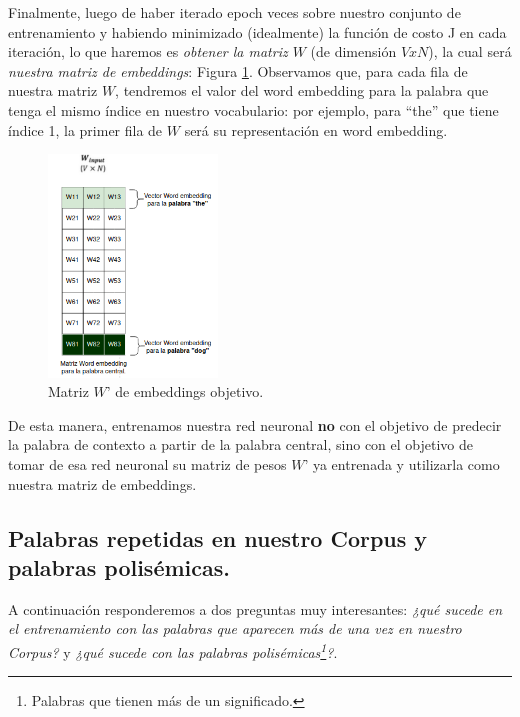 \documentclass[12pt,a4paper]{article}
\begin{document}
\begin{sloppypar}
\begin{enumerate}
\end{enumerate}
      
Finalmente, luego de haber iterado epoch veces sobre nuestro conjunto de entrenamiento y habiendo minimizado (idealmente) la función de costo J en cada iteración, lo que haremos es \textit{obtener la matriz $W$} (de dimensión $V x N$), la cual será \textit{nuestra matriz de embeddings}: Figura \ref{fig:9_EjSkip}. Observamos que, para cada fila de nuestra matriz $W$, tendremos el valor del word embedding para la palabra que tenga el mismo índice en nuestro vocabulario: por ejemplo, para “the” que tiene índice 1, la primer fila de $W$ será su representación en word embedding.

\begin{figure}[H]    %
\centering
\includegraphics[width=0.4\textwidth]{images/Ejemplo_Skipgram/9_EjSkip.png}
\caption{Matriz $W’$ de embeddings objetivo.} 
\label{fig:9_EjSkip}
\end{figure}

De esta manera, entrenamos nuestra red neuronal \textbf{no} con el objetivo de predecir la palabra de contexto a partir de la palabra central, sino con el objetivo de tomar de esa red neuronal su matriz de pesos $W’$ ya entrenada y utilizarla como nuestra matriz de embeddings. \\

\subsection{Palabras repetidas en nuestro Corpus y palabras polisémicas.}\label{anexo_polisem}

A continuación responderemos a dos preguntas muy interesantes: \textit{¿qué sucede en el entrenamiento con las palabras que aparecen más de una vez en nuestro Corpus?} y \textit{¿qué sucede con las palabras polisémicas\footnote{Palabras que tienen más de un significado.}?}.


\end{sloppypar}
\end{document}
